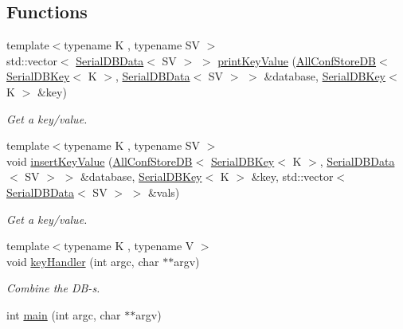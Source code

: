 \subsection*{Functions}
\begin{DoxyCompactItemize}
\item 
{\footnotesize template$<$typename K , typename SV $>$ }\\std\+::vector$<$ \mbox{\hyperlink{classADATIO_1_1SerialDBData}{Serial\+D\+B\+Data}}$<$ SV $>$ $>$ \mbox{\hyperlink{adat-devel_2main_2dbutil_2dbavgcors_8cc_ad99136392a8c4064c84803fee6e0c857}{print\+Key\+Value}} (\mbox{\hyperlink{classFILEDB_1_1AllConfStoreDB}{All\+Conf\+Store\+DB}}$<$ \mbox{\hyperlink{classADATIO_1_1SerialDBKey}{Serial\+D\+B\+Key}}$<$ K $>$, \mbox{\hyperlink{classADATIO_1_1SerialDBData}{Serial\+D\+B\+Data}}$<$ SV $>$ $>$ \&database, \mbox{\hyperlink{classADATIO_1_1SerialDBKey}{Serial\+D\+B\+Key}}$<$ K $>$ \&key)
\begin{DoxyCompactList}\small\item\em Get a key/value. \end{DoxyCompactList}\item 
{\footnotesize template$<$typename K , typename SV $>$ }\\void \mbox{\hyperlink{adat-devel_2main_2dbutil_2dbavgcors_8cc_a8dcef9d29a9dfc5045f4ee378e94fca3}{insert\+Key\+Value}} (\mbox{\hyperlink{classFILEDB_1_1AllConfStoreDB}{All\+Conf\+Store\+DB}}$<$ \mbox{\hyperlink{classADATIO_1_1SerialDBKey}{Serial\+D\+B\+Key}}$<$ K $>$, \mbox{\hyperlink{classADATIO_1_1SerialDBData}{Serial\+D\+B\+Data}}$<$ SV $>$ $>$ \&database, \mbox{\hyperlink{classADATIO_1_1SerialDBKey}{Serial\+D\+B\+Key}}$<$ K $>$ \&key, std\+::vector$<$ \mbox{\hyperlink{classADATIO_1_1SerialDBData}{Serial\+D\+B\+Data}}$<$ SV $>$ $>$ \&vals)
\begin{DoxyCompactList}\small\item\em Get a key/value. \end{DoxyCompactList}\item 
{\footnotesize template$<$typename K , typename V $>$ }\\void \mbox{\hyperlink{adat-devel_2main_2dbutil_2dbavgcors_8cc_a57918e290614430413950cb4fdfd967e}{key\+Handler}} (int argc, char $\ast$$\ast$argv)
\begin{DoxyCompactList}\small\item\em Combine the D\+B-\/s. \end{DoxyCompactList}\item 
int \mbox{\hyperlink{adat-devel_2main_2dbutil_2dbavgcors_8cc_a3c04138a5bfe5d72780bb7e82a18e627}{main}} (int argc, char $\ast$$\ast$argv)
\end{DoxyCompactItemize}


